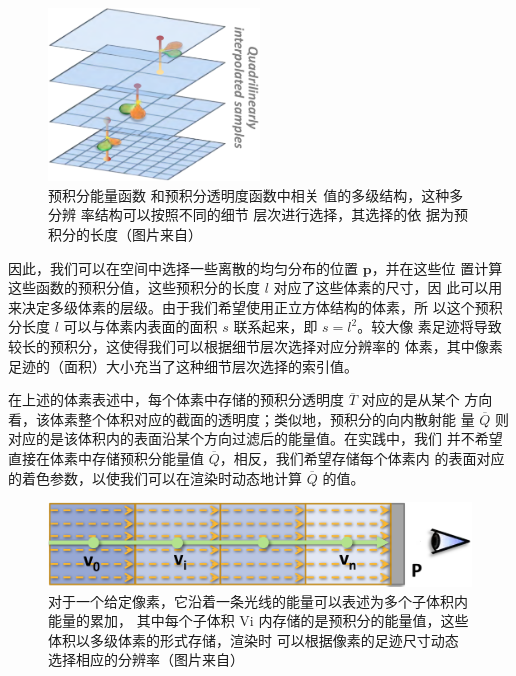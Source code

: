\begin{figure}
\sidecaption
	\includegraphics[width=0.5\textwidth]{figures/vct/vct-7-6}
	\caption{预积分能量函数 和预积分透明度函数中相关 值的多级结构，这种多分辨 率结构可以按照不同的细节 层次进行选择，其选择的依 据为预积分的长度（图片来自\cite{a:InteractiveIndirectIlluminationUsingVoxelConeTracing}）}
	\label{f:vct-7-6}
\end{figure}

因此，我们可以在空间中选择一些离散的均匀分布的位置 $\mathbf{p}$，并在这些位 置计算这些函数的预积分值，这些预积分的长度 $l$ 对应了这些体素的尺寸，因 此可以用来决定多级体素的层级。由于我们希望使用正立方体结构的体素，所 以这个预积分长度 $l$ 可以与体素内表面的面积 $s$ 联系起来，即 $s = l^{2}$。较大像 素足迹将导致较长的预积分，这使得我们可以根据细节层次选择对应分辨率的 体素，其中像素足迹的（面积）大小充当了这种细节层次选择的索引值。

在上述的体素表述中，每个体素中存储的预积分透明度 $\overline{T}$ 对应的是从某个 方向看，该体素整个体积对应的截面的透明度；类似地，预积分的向内散射能 量 $\overline{Q}$ 则对应的是该体积内的表面沿某个方向过滤后的能量值。在实践中，我们 并不希望直接在体素中存储预积分能量值 $\overline{Q}$，相反，我们希望存储每个体素内 的表面对应的着色参数，以使我们可以在渲染时动态地计算 $\overline{Q}$ 的值。

\begin{figure}
	\includegraphics[width=\textwidth]{figures/vct/vct-7-3}
	\caption{对于一个给定像素，它沿着一条光线的能量可以表述为多个子体积内能量的累加， 其中每个子体积 Vi 内存储的是预积分的能量值，这些体积以多级体素的形式存储，渲染时 可以根据像素的足迹尺寸动态选择相应的分辨率（图片来自\cite{a:InteractiveIndirectIlluminationUsingVoxelConeTracing}）}
	\label{f:vct-7-3}
\end{figure}

